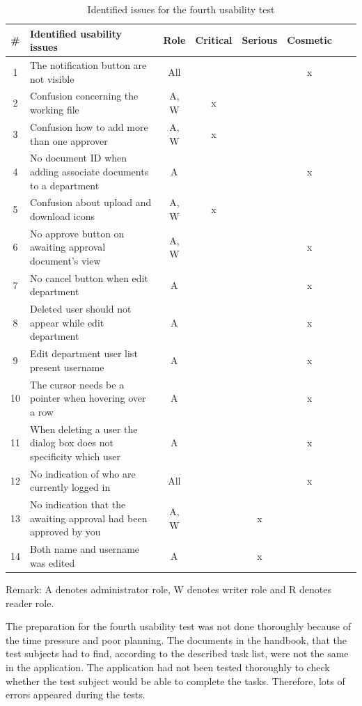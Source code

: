 \begin{table}[H]
	\begin{center}
	\begin{tabular}{| c | m{15em} | c | c | c | c | c | c |}
		\hline
		\# & \textbf{Identified usability issues} & Role & Critical & Serious & Cosmetic \\
		\hline
		 1 & The notification button are not visible & All & & & x \\
		\hline
		 2 & Confusion concerning the working file & A, W & x & & \\
		\hline
		 3 & Confusion how to add more than one approver & A, W & x & & \\
		\hline
		4 & No document ID when adding associate documents to a department & A & & & x\\
		\hline
		5 &  Confusion about upload and download icons & A, W & x &  &\\
		\hline
		6 & No approve button on awaiting approval document's view & A, W &  & & x\\
		\hline
		7 & No cancel button when edit department & A & & & x\\
		\hline
		8 & Deleted user should not appear while edit department & A & & & x \\
		\hline
		9 & Edit department user list present username & A &  & & x \\
		\hline
		10 & The cursor needs be a pointer when hovering over a row & A &  &  & x \\
		\hline
		11 & When deleting a user the dialog box  does not specificity which user & A & & & x\\
		\hline
		12 & No indication of who are currently logged in & All & & & x \\
		\hline
		13 & No indication that the awaiting approval had been approved by you & A, W & & x & \\
		\hline
		14 & Both name and username was edited & A & & x & \\
		\hline
	\end{tabular}
	\end{center}
	 {\raggedright Remark: A denotes administrator role, W denotes writer role and R denotes reader role.\par}
	\caption{Identified issues for the fourth usability test}\label{tab:utest4}
\end{table}

The preparation for the fourth usability test was not done thoroughly because of the time pressure and poor planning.
The documents in the handbook, that the test subjects had to find, according to the described task list, were not the same in the application.
The application had not been tested thoroughly to check whether the test subject would be able to complete the tasks.
Therefore, lots of errors appeared during the tests.

